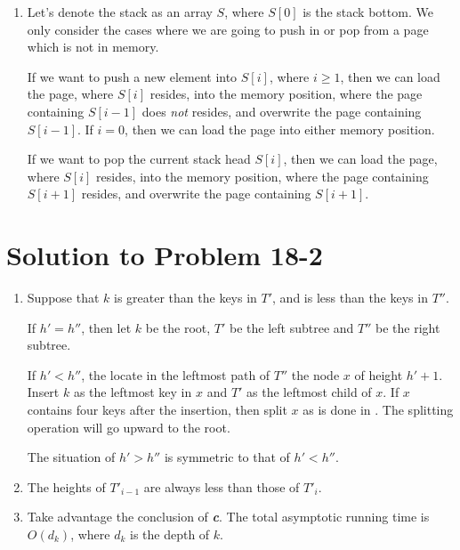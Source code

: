\documentclass[a4paper, fleqn]{article}
\begin{document}
\begin{enumerate}
\renewcommand{\labelenumi}{\itshape \bfseries \alph{enumi}.}


\item  %

Let's denote the stack as an array $S$, where $S[0]$ is the stack
bottom. We only consider the cases where we are going to push in or
pop from a page which is not in memory.

If we want to push a new element into $S[i]$, where $i \geq 1$, then
we can load the page, where $S[i]$ resides, into the memory position,
where the page containing $S[i-1]$ does \emph{not} resides, and
overwrite the page containing $S[i-1]$. If $i = 0$, then we can load
the page into either memory position.

If we want to pop the current stack head $S[i]$, then we can load the
page, where $S[i]$ resides, into the memory position, where the page
containing $S[i+1]$ resides, and overwrite the page containing
$S[i+1]$.

\end{enumerate}






\section*{Solution to Problem 18-2}

\begin{enumerate}
\renewcommand{\labelenumi}{\itshape \bfseries \alph{enumi}.}


\item  %

Suppose that $k$ is greater than the keys in $T'$, and is less than
the keys in $T''$.

If $h' = h''$, then let $k$ be the root, $T'$ be the left subtree and
$T''$ be the right subtree.

If $h' < h''$, the locate in the leftmost path of $T''$ the node $x$
of height $h'+1$. Insert $k$ as the leftmost key in $x$ and $T'$ as
the leftmost child of $x$. If $x$ contains four keys after the
insertion, then split $x$ as is done in . The
splitting operation will go upward to the root.

The situation of $h' > h''$ is symmetric to that of $h' < h''$.

\item  %

The heights of $T'_{i-1}$ are always less than those of $T'_i$.

\item  %

Take advantage the conclusion of \textbf{\emph{c}}. The total
asymptotic running time is $O(d_k)$, where $d_k$ is the depth of $k$.

\end{enumerate}
\end{document}
